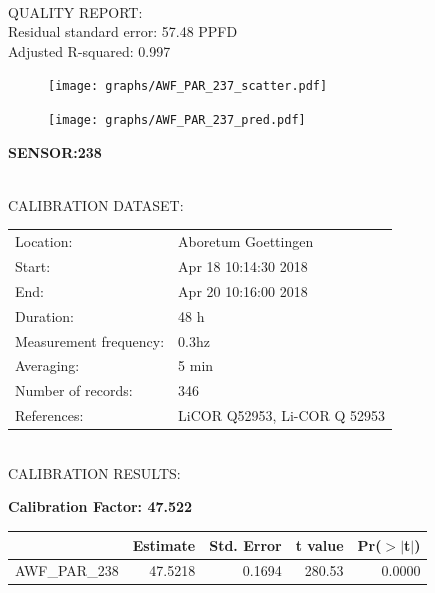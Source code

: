 \documentclass[oneside]{report}
\begin{document}
\hrulefill\\
QUALITY REPORT:\\
Residual standard error: 57.48 PPFD\\
Adjusted R-squared: 0.997



\begin{figure}[H]
  \centering
  \texttt{[image: graphs/AWF\_PAR\_237\_scatter.pdf]}
\end{figure}




\begin{figure}[H]
  \centering
  \texttt{[image: graphs/AWF\_PAR\_237\_pred.pdf]}
\end{figure}

\pagebreak


\begin{center}
\large{\textbf{SENSOR:238}}\\
\end{center}

\hrulefill\\
CALIBRATION DATASET:\\
\begin{table}[h!]
  \centering
  \label{tab:table1}
  \begin{tabular}{ll}
    Location: & Aboretum Goettingen\\ 
    
    
    Start:  & Apr 18 10:14:30 2018 \\
    End:   & Apr 20 10:16:00 2018\\ 
    Duration: & 48 h\\
    Measurement frequency: & 0.3hz\\
    Averaging:  &5 min\\
    Number of records: & 346 \\
    References: & LiCOR Q52953, Li-COR Q 52953 \\
  \end{tabular}
\end{table}

\hrulefill\\
CALIBRATION RESULTS:\\


\begin{center}
\textbf{\large{Calibration Factor: 47.522}}\\
\end{center}
\begin{table}[ht]
\centering
\begin{tabular}{rrrrr}
  \hline
 & Estimate & Std. Error & t value & Pr($>$$|$t$|$) \\ 
  \hline
AWF\_PAR\_238 & 47.5218 & 0.1694 & 280.53 & 0.0000 \\ 
   \hline
\end{tabular}
\end{table}
\end{document}
